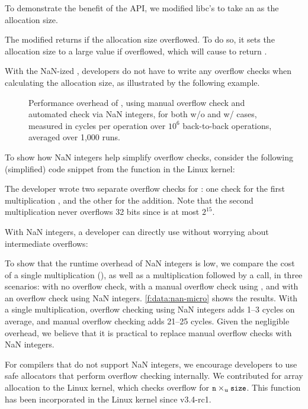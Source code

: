 To demonstrate the benefit of the API, we modified libc's 
to take an  as the allocation size.

The modified  returns  if the allocation size
overflowed.  To do so, it sets the allocation size to a large value
 if  overflowed, which will cause
 to return .

With the NaN-ized , developers do not have to write any overflow
checks when calculating the allocation size, as illustrated by the following
example.


\begin{figure}
\centering

\caption{Performance overhead of ,
using manual overflow check  and
automated check via NaN integers, for both w/o and w/ 
cases, measured in cycles per operation over $10^6$ back-to-back
operations, averaged over 1,000 runs.}
\label{f:data:nan-micro}
\end{figure}

To show how NaN integers help simplify overflow checks,
consider the following (simplified) code snippet from the
 function in the Linux kernel:
%

%
The developer wrote two separate overflow checks for
:
one check for the first multiplication , and
the other for the addition.
Note that the second multiplication 
never overflows 32 bits since  is at most $2^{15}$.

With NaN integers, a developer can directly use 
without worrying about intermediate overflows:


To show that the runtime overhead of NaN integers is low, we compare
the cost of a single multiplication (), as well as a multiplication
followed by a  call, in three scenarios: with no overflow
check, with a manual overflow check using
, and with an overflow check using
NaN integers.
%
\autoref{f:data:nan-micro} shows the results.
%
With a single multiplication, overflow checking using NaN integers
adds 1--3 cycles on average, and manual overflow checking adds
21--25 cycles.
%
Given the negligible overhead, we believe that it is practical
to replace manual overflow checks with NaN integers.

For compilers that do not support NaN integers, we encourage developers to use
safe allocators that perform overflow checking internally.  We contributed
 for array allocation to the Linux kernel, which
checks overflow for $\cc{n} \times_u \cc{size}$. This function has been
incorporated in the Linux kernel since v3.4-rc1.

